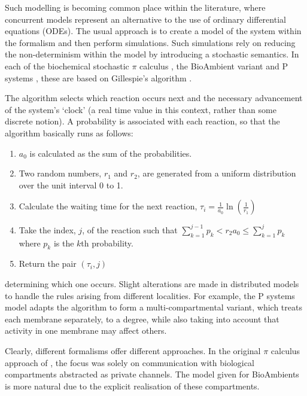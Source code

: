 Such modelling is becoming common place within the
literature\cite{biospi, cardelli:bioambients, fran}, where concurrent
models represent an alternative to the use of ordinary differential
equations (ODEs).  The usual approach is to create a model of the
system within the formalism and then perform simulations.  Such
simulations rely on reducing the non-determinism within the model by
introducing a stochastic semantics.  In each of the biochemical
stochastic $\pi$ calculus \cite{biospi}, the BioAmbient variant
\cite{cardelli:bioambients} and P systems \cite{fran}, these are based
on Gillespie's algorithm \cite{gillespie}.

The algorithm selects which reaction occurs next and the necessary
advancement of the system's `clock' (a real time value in this context,
rather than some discrete notion).  A probability is associated with
each reaction, so that the algorithm basically runs as follows:

\begin{enumerate}
\item $a_0$ is calculated as the sum of the probabilities.
\item Two random numbers, $r_1$ and $r_2$, are generated from a uniform
      distribution over the unit interval 0 to 1.
\item Calculate the waiting time for the next reaction, $\tau_i =
      \frac{1}{a_0} \ln (\frac{1}{r_1})$
\item Take the index, $j$, of the reaction such that
      $\displaystyle\sum_{k=1}^{j-1} p_k < r_2 a_0 \le
      \displaystyle\sum_{k=1}^jp_k$ where $p_k$ is the $k$th probability.
\item Return the pair $(\tau_i, j)$
\end{enumerate}

\noindent determining which one occurs.  Slight alterations are made in
distributed models to handle the rules arising from different localities.
For example, the P systems model \cite{fran} adapts the algorithm to
form a multi-compartmental variant, which treats each membrane
separately, to a degree, while also taking into account that activity
in one membrane may affect others.

Clearly, different formalisms offer different approaches.  In the
original $\pi$ calculus approach of \cite{biospi}, the focus was solely
on communication with biological compartments abstracted as private
channels.  The model given for BioAmbients \cite{cardelli:bioambients}
is more natural due to the explicit realisation of these compartments.

